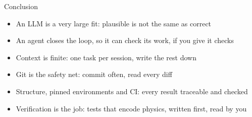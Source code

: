 \begin{frame}{Conclusion}
  \begin{itemize}
    \item An LLM is a very large fit: plausible is not the same as correct
    \item An agent closes the loop, so it can check its work, if you give it checks
    \item Context is finite: one task per session, write the rest down
    \item Git is the safety net: commit often, read every diff
    \item Structure, pinned environments and CI: every result traceable and checked
    \item Verification is the job: tests that encode physics, written first, read by you
  \end{itemize}
\end{frame}
